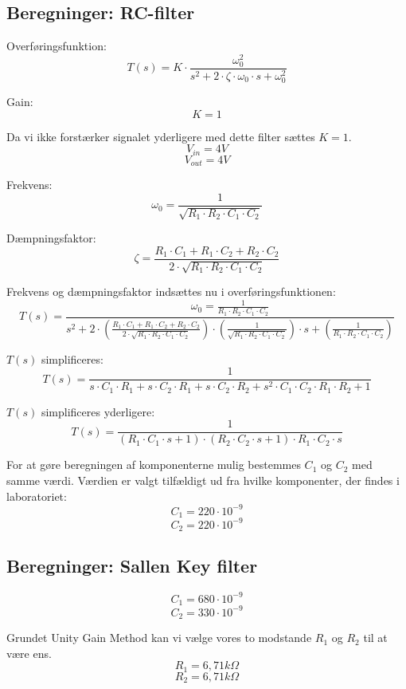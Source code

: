 \clearpage
  
\subsection{Beregninger: RC-filter} \label{RC-filter}
\vspace{0.2 cm}
Overføringsfunktion: 
\[ T(s)=K \cdot \frac{\omega_{0}^{2}}{{s^{2}+2 \cdot \zeta \cdot \omega_{0}\cdot s+\omega_{0}^{2}}} \]

Gain:
\[ K=1 \]



Da vi ikke forstærker signalet yderligere med dette filter sættes $K=1$.
\[ V_{in}=4V \]
\[ V_{out}=4V \]

Frekvens:
\[ \omega_{0}=\frac{1}{\sqrt{R_{1} \cdot R_{2} \cdot C_{1} \cdot C_{2}}} \]

Dæmpningsfaktor:
\[ \zeta= \frac{R_{1} \cdot C_{1} + R_{1} \cdot C_{2}+R_{2} \cdot C_{2}}{2 \cdot \sqrt{R_{1} \cdot R_{2} \cdot C_{1} \cdot C_{2}}} \]

Frekvens og dæmpningsfaktor indsættes nu i overføringsfunktionen:
\[ T(s)=\frac{\omega_{0}=\frac{1}{R_{1} \cdot R_{2} \cdot C_{1} \cdot C_{2}}}{s^{2}+2 \cdot (\frac{R_{1} \cdot C_{1} + R_{1} \cdot C_{2}+R_{2} \cdot C_{2}}{2 \cdot \sqrt{R_{1} \cdot R_{2} \cdot C_{1} \cdot C_{2}}}) \cdot (\frac{1}{\sqrt{R_{1} \cdot R_{2} \cdot C_{1} \cdot C_{2}}}) \cdot s + (\frac{1}{R_{1} \cdot R_{2} \cdot C_{1} \cdot C_{2}})}  \]

$T(s)$ simplificeres:
\[ T(s)=\frac{1}{s \cdot C_{1} \cdot R_{1} +s \cdot C_{2} \cdot R_{1}+s \cdot C_{2} \cdot R_{2}+s^{2}\cdot C_{1} \cdot C_{2} \cdot R_{1} \cdot R_{2} +1} \]

$T(s)$ simplificeres yderligere:
\[ T(s)=\frac{1}{(R_{1} \cdot C_{1} \cdot s+1) \cdot (R_{2} \cdot C_{2} \cdot s +1) \cdot R_{1} \cdot C_{2} \cdot s} \]

For at gøre beregningen af komponenterne mulig bestemmes $ C_{1} $ og $ C_{2} $ med samme værdi. Værdien er valgt tilfældigt ud fra hvilke komponenter, der findes i laboratoriet:
\[ C_{1} = 220 \cdot 10^{-9} \]
\[ C_{2} = 220 \cdot 10^{-9} \]


\subsection{Beregninger: Sallen Key filter}
\vspace{0.5 cm}
\[ C_{1} = 680 \cdot 10^{-9} \]
\[ C_{2} = 330 \cdot 10^{-9} \]

Grundet Unity Gain Method kan vi vælge vores to modstande $ R_{1} $ og $ R_{2} $ til at være ens.
\[ R_{1} = 6,71 k\Omega \]
\[ R_{2} = 6,71 k\Omega \]

